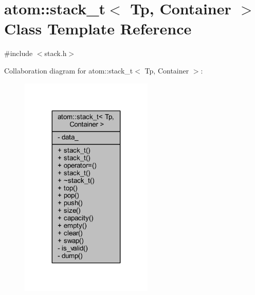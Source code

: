 \hypertarget{classatom_1_1stack__t}{}\section{atom\+:\+:stack\+\_\+t$<$ Tp, Container $>$ Class Template Reference}
\label{classatom_1_1stack__t}


{\ttfamily \#include $<$stack.\+h$>$}



Collaboration diagram for atom\+:\+:stack\+\_\+t$<$ Tp, Container $>$\+:
\nopagebreak
\begin{figure}[H]
\begin{center}
\leavevmode
\includegraphics[width=179pt]{classatom_1_1stack__t__coll__graph}
\end{center}
\end{figure}
